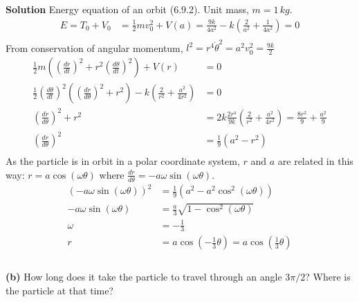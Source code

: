 \documentclass[]{article}
\newcommand{\bd}{\textbf}
\begin{document}
	\bd{Solution} Energy equation of an orbit (6.9.2). Unit mass, $ m = 1 \, kg $. \\
	\begin{equation}
		\begin{split}
			E = T_0 + V_0 &= \frac{1}{2}mv_0^2 + V(a) = \frac{9k}{4a^2} - k\left( \frac{2}{a^2} + \frac{1}{4a^2} \right) = 0 \\			
		\end{split}
	\end{equation}
	From conservation of angular momentum, $ l^2 = r^4\dot{\theta}^2 = a^2 v_0^2 = \frac{9k}{2} $
	\begin{equation}
		\begin{split}
			\frac{1}{2}m \left(\left( \frac{dr}{dt} \right)^2 + r^2 \left( \frac{d\theta}{dt} \right)^2\right) + V(r) &= 0 \\
			\frac{1}{2} \left( \frac{d\theta}{dt} \right)^2 \left(\left( \frac{dr}{d\theta} \right)^2 + r^2 \right) - k\left( \frac{2}{r^2} + \frac{a^2}{4r^2} \right) &= 0 \\
			\left( \frac{dr}{d\theta} \right)^2 + r^2 &= 2k \frac{2r^4}{9k} \left( \frac{2}{r^2} + \frac{a^2}{4r^2} \right) = \frac{8r^2}{9} + \frac{a^2}{9} \\
			\left( \frac{dr}{d\theta} \right)^2 &= \frac{1}{9}(a^2 - r^2)  \\
		\end{split}
	\end{equation}
	As the particle is in orbit in a polar coordinate system, $ r $ and $ a $ are related in this way: $ r = a \cos (\omega\theta) $ where $\frac{dr}{d\theta} = -a\omega \sin (\omega\theta) $.
		\begin{equation}
		\begin{split}
			\left( -a\omega \sin (\omega\theta) \right)^2 &= \frac{1}{9}(a^2 - a^2 \cos^2 (\omega\theta))  \\
			-a\omega \sin (\omega\theta) &= \frac{a}{3} \sqrt{1 - \cos^2 (\omega\theta)} \\
			\omega &= -\frac{1}{3} \\
			r &= a \cos (-\frac{1}{3} \theta) = a \cos (\frac{1}{3} \theta) \\
		\end{split}
	\end{equation}
	\\
	\bd{(b)} How long does it take the particle to travel through an angle $ 3\pi / 2 $? Where is the particle at that time? \\
\end{document}
